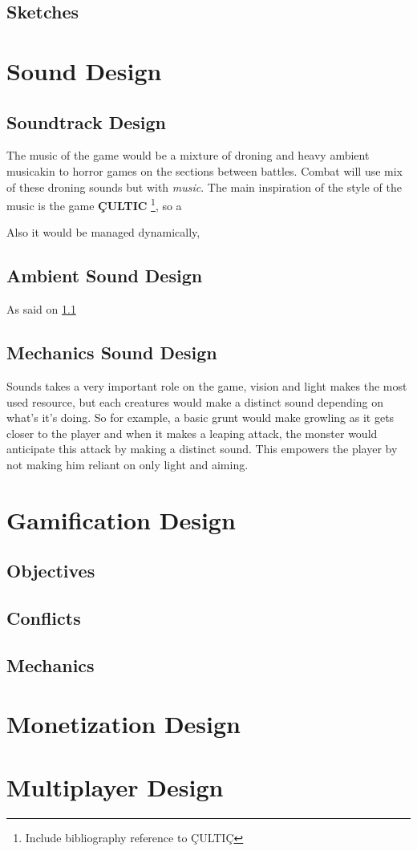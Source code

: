 \subsection{Sketches}

\section{Sound Design}
\subsection{Soundtrack Design} \label{ost}
The music of the game would be a mixture of droning and heavy ambient musicakin to horror games on the sections between battles. Combat will use mix of these droning sounds but with \textit{music}.
The main inspiration of the style of the music is the game \textbf{ÇULTIC} \footnote{Include bibliography reference to ÇULTIÇ}, so a

Also it would be managed dynamically,

\subsection{Ambient Sound Design}
As said on \ref{ost}
\subsection{Mechanics Sound Design}
Sounds takes a very important role on the game, vision and light makes the most used resource, but each creatures would make a distinct sound depending on what's it's doing.
So for example, a basic grunt would make growling as it gets closer to the player and when it makes a leaping attack, the monster would anticipate this attack by making a distinct sound.
This empowers the player by not making him reliant on only light and aiming.

\section{Gamification Design}
\subsection{Objectives}
\subsection{Conflicts}
\subsection{Mechanics}

\section{Monetization Design}

\section{Multiplayer Design}


